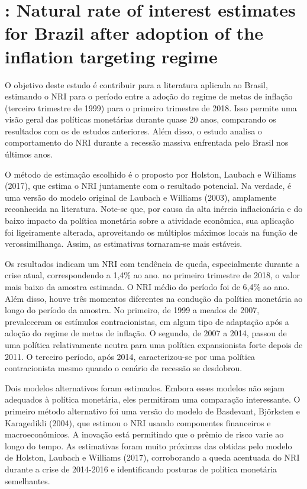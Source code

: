 \documentclass[11pt,oneside,a4paper]{article}
\begin{document}
\section{\citet{Moreira:2019}: Natural rate of interest estimates for Brazil after adoption of the inflation targeting regime }

O objetivo deste estudo é contribuir para a literatura aplicada ao Brasil, estimando o NRI para o período entre a adoção do regime de metas de inflação (terceiro trimestre de 1999) para o primeiro trimestre de 2018. Isso permite uma visão geral das políticas monetárias durante quase 20 anos, comparando os resultados com os de estudos anteriores. Além disso, o estudo analisa o comportamento do NRI durante a recessão massiva enfrentada pelo Brasil nos últimos anos.

O método de estimação escolhido é o proposto por Holston, Laubach e Williams (2017), que estima o NRI juntamente com o resultado potencial. Na verdade, é uma versão do modelo original de Laubach e Williams (2003), amplamente reconhecida na literatura. Note-se que, por causa da alta inércia inflacionária e do baixo impacto da política monetária sobre a atividade econômica, sua aplicação foi ligeiramente alterada, aproveitando os múltiplos máximos locais na função de verossimilhança. Assim, as estimativas tornaram-se mais estáveis.

Os resultados indicam um NRI com tendência de queda, especialmente durante a crise atual, correspondendo a 1,4$\%$ ao ano. no primeiro trimestre de 2018, o valor mais baixo da amostra estimada. O NRI médio do período foi de 6,4$\%$ ao ano. Além disso, houve três momentos diferentes na condução da política monetária ao longo do período da amostra. No primeiro, de 1999 a meados de 2007, prevaleceram os estímulos contracionistas, em algum tipo de adaptação após a adoção do regime de metas de inflação. O segundo, de 2007 a 2014, passou de uma política relativamente neutra para uma política expansionista forte depois de 2011. O terceiro período, após 2014, caracterizou-se por uma política contracionista mesmo quando o cenário de recessão se desdobrou.

Dois modelos alternativos foram estimados. Embora esses modelos não sejam adequados à política monetária, eles permitiram uma comparação interessante. O primeiro método alternativo foi uma versão do modelo de Basdevant, Björksten e Karagedikli (2004), que estimou o NRI usando componentes financeiros e macroeconômicos. A inovação está permitindo que o prêmio de risco varie ao longo do tempo. As estimativas foram muito próximas das obtidas pelo modelo de Holston, Laubach e Williams (2017), corroborando a queda acentuada do NRI durante a crise de 2014-2016 e identificando posturas de política monetária semelhantes.
\end{document}
